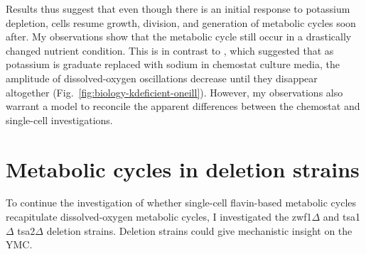 Results thus suggest that even though there is an initial response to potassium depletion, cells resume growth, division, and generation of metabolic cycles soon after.
My observations show that the metabolic cycle still occur in a drastically changed nutrient condition.
This is in contrast to \textcite{oneillEukaryoticCellBiology2020}, which suggested that as potassium is graduate replaced with sodium in chemostat culture media, the amplitude of dissolved-oxygen oscillations decrease until they disappear altogether (Fig.\ \ref{fig:biology-kdeficient-oneill}).
However, my observations also warrant a model to reconcile the apparent differences between the chemostat and single-cell investigations.


\section{Metabolic cycles in deletion strains}
\label{sec:biology-deletions}


To continue the investigation of whether single-cell flavin-based metabolic cycles recapitulate dissolved-oxygen metabolic cycles, I investigated the zwf1$\Delta$ and tsa1$\Delta$ tsa2$\Delta$ deletion strains.
Deletion strains could give mechanistic insight on the YMC.



